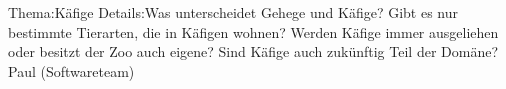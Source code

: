 
%
	{Thema:}{Käfige}%
	{Details:}{Was unterscheidet Gehege und Käfige? \newline Gibt es nur bestimmte Tierarten, die in Käfigen wohnen? \newline Werden Käfige immer ausgeliehen oder besitzt der Zoo auch eigene? \newline Sind Käfige auch zukünftig Teil der Domäne?}%
	{Paul (Softwareteam)}